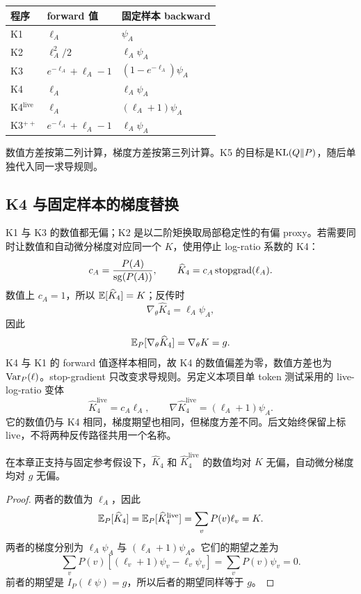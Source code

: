 \begin{center}
\begin{tabular}{lll}
\toprule
程序 & forward 值 & 固定样本 backward\\
\midrule
K1 & $\ell_A$ & $\psi_A$\\
K2 & $\ell_A^2/2$ & $\ell_A\psi_A$\\
K3 & $e^{-\ell_A}+\ell_A-1$ & $(1-e^{-\ell_A})\psi_A$\\
K4 & $\ell_A$ & $\ell_A\psi_A$\\
K4$^{\mathrm{live}}$ & $\ell_A$ & $(\ell_A+1)\psi_A$\\
K3$^{++}$ & $e^{-\ell_A}+\ell_A-1$ & $\ell_A\psi_A$\\
\bottomrule
\end{tabular}
\end{center}
数值方差按第二列计算，梯度方差按第三列计算。K5 的目标是$\operatorname{KL}(Q\Vert P)$，随后单独代入同一求导规则。

\subsection{K4 与固定样本的梯度替换}
K1 与 K3 的数值都无偏；K2 是以二阶矩换取局部稳定性的有偏 proxy。若需要同时让数值和自动微分梯度对应同一个 $K$，使用停止 log-ratio 系数的 K4：
\begin{equation*}
 c_A=\frac{P(A)}{\operatorname{sg}(P(A))},\qquad
 \widehat K_4=c_A\operatorname{stopgrad}(\ell_A).
\end{equation*}
数值上 $c_A=1$，所以 $\mathbb E[\widehat K_4]=K$；反传时
\begin{equation*}
 \nabla_\theta\widehat K_4=\ell_A\psi_A,
\end{equation*}
因此
\begin{equation*}
 \mathbb E_P[\nabla_\theta\widehat K_4]=\nabla_\theta K=g.
\end{equation*}
K4 与 K1 的 forward 值逐样本相同，故 K4 的数值偏差为零，数值方差也为 $\operatorname{Var}_P(\ell)$。stop-gradient 只改变求导规则。另定义本项目单 token 测试采用的 live-log-ratio 变体
\begin{equation*}
 \widehat K_4^{\mathrm{live}}=c_A \ell_A,\qquad
 \nabla\widehat K_4^{\mathrm{live}}=(\ell_A+1)\psi_A.
\end{equation*}
它的数值仍与 K4 相同，梯度期望也相同，但梯度方差不同。后文始终保留上标 $\mathrm{live}$，不将两种反传路径共用一个名称。

\begin{theorem}[K4 的数值与梯度无偏性]
\label{est:thm:k4}
在本章正支持与固定参考假设下，$\widehat K_4$ 和 $\widehat K_4^{\mathrm{live}}$ 的数值均对 $K$ 无偏，自动微分梯度均对 $g$ 无偏。
\end{theorem}
\begin{proof}
两者的数值为 $\ell_A$，因此
\begin{equation}
\mathbb E_P[\widehat K_4]=\mathbb E_P[\widehat K_4^{\mathrm{live}}]=\sum_vP(v)\ell_v=K.
\end{equation}
两者的梯度分别为 $\ell_A\psi_A$ 与 $(\ell_A+1)\psi_A$。它们的期望之差为
\begin{equation}
\sum_vP(v)[(\ell_v+1)\psi_v-\ell_v\psi_v]=\sum_vP(v)\psi_v=0.
\end{equation}
前者的期望是 $I_P(\ell\psi)=g$，所以后者的期望同样等于 $g$。
\end{proof}

